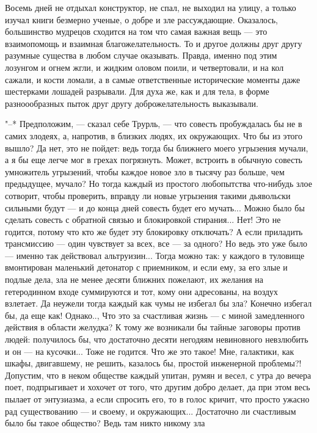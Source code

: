 Восемь дней не отдыхал конструктор, не спал, не выходил
на улицу, а только изучал книги безмерно ученые, о добре и
зле рассуждающие. Оказалось, большинство мудрецов сходится
на том что самая важная вещь --- это взаимопомощь и взаимная
благожелательность. То и другое должны друг другу разумные
существа в любом случае оказывать. Правда, именно под этим
лозунгом и огнем жгли, и жидким оловом поили, и
четвертовали, и на кол сажали, и кости ломали, а в самые
ответственные исторические моменты даже шестерками лошадей
разрывали. Для духа же, как и для тела, в форме
разноообразных пыток друг другу доброжелательность
выказывали.

"--* Предположим, --- сказал себе Трурль, --- что совесть
пробуждалась бы не в самих злодеях, а, напротив, в близких
людях, их окружающих. Что бы из этого вышло? Да нет, это не
пойдет: ведь тогда бы ближнего моего угрызения мучали, а я
бы еще легче мог в грехах погрязнуть. Может, встроить в
обычную совесть умножитель угрызений, чтобы каждое новое зло
в тысячу раз больше, чем предыдущее, мучало? Но тогда каждый
из простого любопытства что-нибудь злое сотворит, чтобы
проверить, вправду ли новые угрызения такими дьявольски
сильными будут --- и до конца дней совесть будет его мучать...
Можно было бы сделать совесть с обратной связью и
блокировкой стирания... Нет! Это не годится, потому что кто
же будет эту блокировку отключать? А если приладить
трансмиссию --- один чувствует за всех, все --- за одного? Но
ведь это уже было --- именно так действовал альтруизин...
Тогда можно так: у каждого в туловище вмонтирован маленький
детонатор с приемником, и если ему, за его злые и подлые
дела, зла не менее десяти ближних пожелают, их желания на
гетеродинном входе суммируются и тот, кому они адресованы,
на воздух взлетает. Да неужели тогда каждый как чумы не
избегал бы зла? Конечно избегал бы, да еще как! Однако..,
Что это за счастливая жизнь --- с миной замедленного действия
в области желудка? К тому же возникали бы тайные заговоры
против людей: получилось бы, что достаточно десяти негодяям
невиновного невзлюбить и он --- на кусочки... Тоже не годится.
Что же это такое! Мне, галактики, как шкафы, двигавшему, не
решить, казалось бы, простой инженерной проблемы?! Допустим,
что в неком обществе каждый упитан, румян и весел, с утра до
вечера поет, подпрыгивает и хохочет от того, что другим
добро делает, да при этом весь пылает от энтузиазма, а если
спросить его, то в голос кричит, что просто ужасно рад
существованию --- и своему, и окружающих... Достаточно ли
счастливым было бы такое общество? Ведь там никто никому зла
